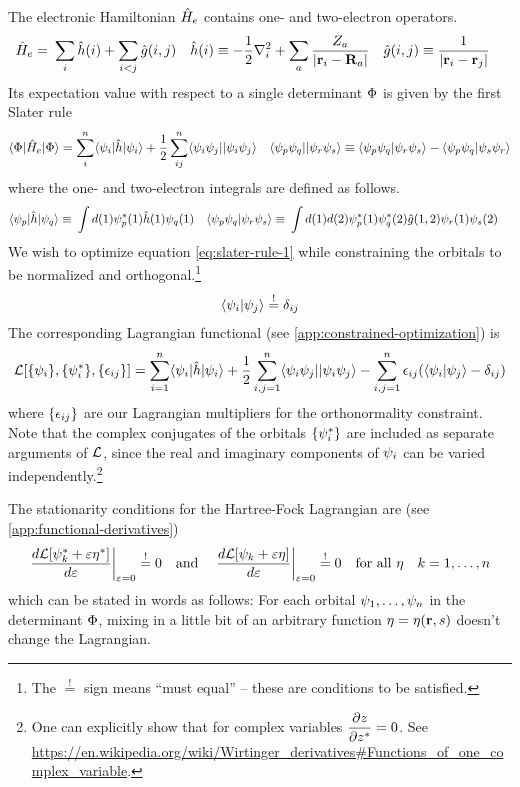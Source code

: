 \documentclass[11pt]{article}
\numberwithin{equation}{section}
\begin{document}
The electronic Hamiltonian $\hat{H}_e$ contains one- and two-electron operators.
\begin{align}
  \hat{H}_e
=&\
  \sum_i
  \hat{h}(i)
+
  \sum_{i<j}
  \hat{g}(i,j)
&
  \hat{h}(i)
&\equiv
-
  \frac {1}{2}
  \nabla_i^2
+
  \sum_a
  \frac {Z_a}{|\mathbf{r}_i-\mathbf{R}_a|}
&
  \hat{g}(i,j)
&\equiv
  \frac {1}{|\mathbf{r}_i-\mathbf{r}_j|}
\end{align}
Its expectation value with respect to a single determinant $\Phi $ is given by the first Slater rule
\begin{align}
\label{eq:slater-rule-1}
  \langle\Phi |\hat{H}_e|\Phi \rangle
=
\sum_{i}^n
  \langle\psi _i|\hat{h}|\psi _i\rangle
+\frac {1}{2}\sum_{ij}^n
  \langle\psi _i\psi _j||\psi _i\psi _j\rangle
&&
  \langle\psi _p\psi _q||\psi _r\psi _s\rangle
\equiv
  \langle\psi _p\psi _q|\psi _r\psi _s\rangle
-
  \langle\psi _p\psi _q|\psi _s\psi _r\rangle
\end{align}
where the one- and two-electron integrals are defined as follows.
\begin{align}
\label{eq:one-and-two-electron-integrals}
  \langle\psi _p|\hat{h}|\psi _q\rangle
\equiv&\
  \int
  d(1)
  \psi _p^*(1)
  \hat{h}(1)
  \psi _q(1)
&
  \langle\psi _p\psi _q|\psi _r\psi _s\rangle
\equiv&\
  \int
  d(1)d(2)
  \psi _p^*(1)\psi _q^*(2)
  \hat{g}(1,2)
  \psi _r(1)\psi _s(2)
\end{align}
We wish to optimize equation \ref{eq:slater-rule-1} while constraining the orbitals to be normalized and orthogonal.\footnote{The $\overset{!}=$ sign means ``must equal'' -- these are conditions to be satisfied.}
\begin{align}
  \langle\psi _i|\psi _j\rangle
\overset{!}{=}
  \delta _{ij}
\end{align}
The corresponding Lagrangian functional (see \cref{app:constrained-optimization}) is
\begin{align}\label{eq:hartree-fock-lagrangian}
  \mathcal{L}[\{\psi _i\},\{\psi _i^*\},\{\epsilon _{ij}\}]
=
  \sum_{i=1}^n
  \langle\psi _i|\hat{h}|\psi _i\rangle
+
  \frac {1}{2}
  \sum_{i,j=1}^n
  \langle\psi _i\psi _j||\psi _i\psi _j\rangle
-
  \sum_{i,j=1}^n
  \epsilon _{ij}(\langle\psi _i|\psi _j\rangle-\delta _{ij})
\end{align}
where $\{\epsilon _{ij}\}$ are our Lagrangian multipliers for the orthonormality constraint.
Note that the complex conjugates of the orbitals $\{\psi _i^*\}$ are included as separate arguments of $\mathcal{L}$, since the real and imaginary components of $\psi _i$ can be varied independently.\footnote{One can explicitly show that for complex variables $\dfrac{\partial z}{\partial z^*}=0$.  See \url{https://en.wikipedia.org/wiki/Wirtinger_derivatives#Functions_of_one_complex_variable}.}

The stationarity conditions for the Hartree-Fock Lagrangian are (see \cref{app:functional-derivatives})
\begin{align}\label{eq:hartree-fock-lagrangian-stationarity}
\left.
  \frac {d\mathcal{L}[\psi _k^*+\varepsilon \eta ^*]}{d\varepsilon}
\right|_{\varepsilon=0}
\overset{!}=
  0
\hspace{10pt}
  \text{and}
\hspace{10pt}
\left.
  \frac {d\mathcal{L}[\psi _k+\varepsilon \eta ]}{d\varepsilon}
\right|_{\varepsilon=0}
\overset{!}=
  0
\hspace{10pt}
  \text{for all $\eta $}
&&
  k=1,\ldots,n
\end{align}
which can be stated in words as follows: For each orbital $\psi _1,\ldots,\psi _n$ in the determinant $\Phi $, mixing in a little bit of an arbitrary function $\eta=\eta(\mathbf{r},s)$ doesn't change the Lagrangian.
\end{document}
